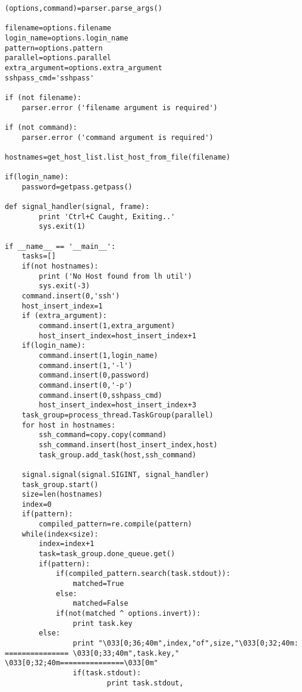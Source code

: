 \documentclass[a4paper,11pt]{article}
\begin{document}
\begin{lstlisting}
(options,command)=parser.parse_args()

filename=options.filename
login_name=options.login_name
pattern=options.pattern
parallel=options.parallel
extra_argument=options.extra_argument
sshpass_cmd='sshpass'

if (not filename):
    parser.error ('filename argument is required')

if (not command):
    parser.error ('command argument is required')

hostnames=get_host_list.list_host_from_file(filename)

if(login_name):
    password=getpass.getpass()

def signal_handler(signal, frame):
        print 'Ctrl+C Caught, Exiting..'
        sys.exit(1)

if __name__ == '__main__':
    tasks=[]
    if(not hostnames):
        print ('No Host found from lh util')
        sys.exit(-3)
    command.insert(0,'ssh')
    host_insert_index=1
    if (extra_argument):
        command.insert(1,extra_argument)
        host_insert_index=host_insert_index+1
    if(login_name):
        command.insert(1,login_name)
        command.insert(1,'-l')
        command.insert(0,password)
        command.insert(0,'-p')
        command.insert(0,sshpass_cmd)
        host_insert_index=host_insert_index+3
    task_group=process_thread.TaskGroup(parallel)
    for host in hostnames:
        ssh_command=copy.copy(command)
        ssh_command.insert(host_insert_index,host)
        task_group.add_task(host,ssh_command)

    signal.signal(signal.SIGINT, signal_handler)
    task_group.start()
    size=len(hostnames)
    index=0
    if(pattern):
        compiled_pattern=re.compile(pattern)
    while(index<size):
        index=index+1
        task=task_group.done_queue.get()
        if(pattern):
            if(compiled_pattern.search(task.stdout)):
                matched=True
            else:
                matched=False
            if(not(matched ^ options.invert)):
                print task.key 
        else:
                print "\033[0;36;40m",index,"of",size,"\033[0;32;40m: =============== \033[0;33;40m",task.key," \033[0;32;40m===============\033[0m"
                if(task.stdout):
                        print task.stdout,
\end{lstlisting}
\end{document}
